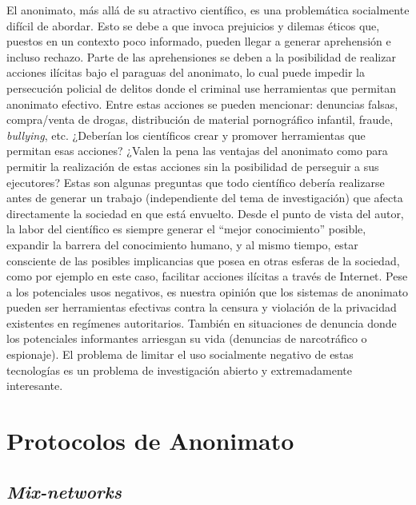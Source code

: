 El anonimato, más allá de su atractivo científico, es una problemática 
socialmente difícil de abordar. Esto se debe a que invoca prejuicios y dilemas 
éticos que, puestos en un contexto poco informado, pueden llegar a generar 
aprehensión e incluso rechazo. Parte de las aprehensiones se deben a la 
posibilidad de realizar acciones ilícitas bajo el paraguas del anonimato, lo 
cual puede impedir la persecución policial de delitos donde el criminal use 
herramientas que permitan anonimato efectivo. Entre estas acciones se pueden 
mencionar: denuncias falsas, compra/venta de drogas, distribución de material 
pornográfico infantil, fraude, \emph{bullying}, etc. ¿Deberían los científicos 
crear y promover herramientas que permitan esas acciones? ¿Valen la pena las 
ventajas del anonimato como para permitir la realización de estas acciones sin 
la posibilidad de perseguir a sus ejecutores? Estas son algunas preguntas que 
todo científico debería realizarse antes de generar un trabajo (independiente 
del tema de investigación) que afecta directamente la sociedad en que está 
envuelto. Desde el punto de vista del autor, la labor del científico es 
siempre generar el ``mejor conocimiento'' posible, expandir la barrera del 
conocimiento humano, y al mismo tiempo, estar consciente de las posibles 
implicancias que posea en otras esferas de la sociedad, como por ejemplo en 
este caso, facilitar acciones ilícitas a través de Internet. Pese a los 
potenciales usos negativos, es nuestra opinión que los sistemas de anonimato 
pueden ser herramientas efectivas contra la censura y violación de la 
privacidad existentes en regímenes autoritarios. También en situaciones de 
denuncia donde los potenciales informantes arriesgan su vida (denuncias de 
narcotráfico o espionaje). El problema de limitar el uso socialmente negativo 
de estas tecnologías es un problema de investigación abierto y extremadamente 
interesante.  

\section{Protocolos de Anonimato}

\subsection{\emph{Mix-networks}}

